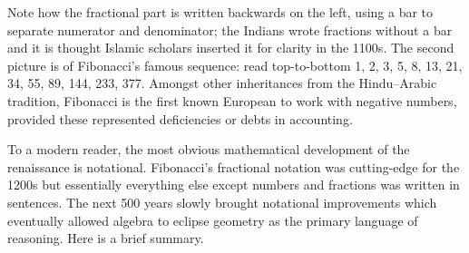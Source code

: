 Note how the fractional part is written backwards on the left, using a bar to separate numerator and denominator; the Indians wrote fractions without a bar and it is thought Islamic scholars inserted it for clarity in the 1100s. The second picture is of Fibonacci's famous sequence: read top-to-bottom 1, 2, 3, 5, 8, 13, 21, 34, 55, 89, 144, 233, 377. Amongst other inheritances from the Hindu--Arabic tradition, Fibonacci is the first known European to work with negative numbers, provided these represented deficiencies or debts in accounting. %



\goodbreak




To a modern reader, the most obvious mathematical development of the renaissance is notational. Fibonacci's fractional notation was cutting-edge for the 1200s but essentially everything else except numbers and fractions was written in sentences. The next 500 years slowly brought notational improvements which eventually allowed algebra to eclipse geometry as the primary language of reasoning. Here is a brief summary.

